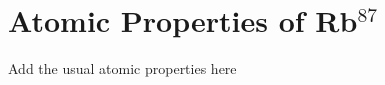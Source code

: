 
%


\chapter{Atomic Properties of Rb$^{87}$}
\label{App:AtomProp}

Add the usual atomic properties here

